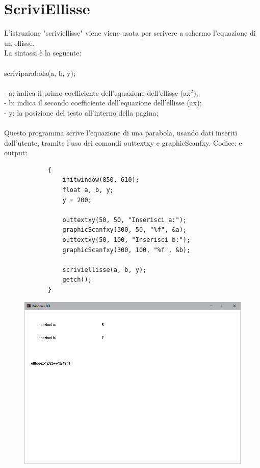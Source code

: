 \documentclass[12pt]{book}
\begin{document}
		\section{ScriviEllisse}
		L'istruzione "scriviellisse" viene viene usata per scrivere a schermo l'equazione di un ellisse.
		\\La sintassi è la seguente:
		\\
		\\
		\Large scriviparabola(a, b, y);
		\normalsize
		\\
		\\- a: indica il primo coefficiente dell'equazione dell'ellisse (ax$^2$);
		\\- b: indica il secondo coefficiente dell'equazione dell'ellisse (ax);
		\\- y: la posizione del testo all'interno della pagina;
		\\
		\\Questo programma scrive l'equazione di una parabola, usando dati inseriti dall'utente, tramite l'uso dei comandi outtextxy e graphicScanfxy.
		Codice: e output:
		\begin{lstlisting}
			{
				initwindow(850, 610);
				float a, b, y;
				y = 200;
				
				outtextxy(50, 50, "Inserisci a:");
				graphicScanfxy(300, 50, "%f", &a);
				outtextxy(50, 100, "Inserisci b:");
				graphicScanfxy(300, 100, "%f", &b);
				
				scriviellisse(a, b, y);
				getch();
			}
		\end{lstlisting}
	
		\begin{figure}[h]
			\includegraphics[scale=0.5]{scriviellisseterminale1}
		\end{figure}
		\clearpage



		
	
	
	
\end{document}
